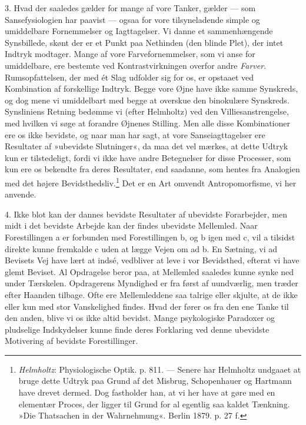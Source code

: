 \documentclass[12pt,a4paper,openany]{book}
\newcommand{\opage}[1]{\marginnote{\footnotesize\textit{[#1]}}}
\begin{document}
3. Hvad der saaledes gælder for mange af vore Tanker, gælder --- som
Sansefysiologien har paavist --- ogsaa for vore tilsyneladende simple og
umiddelbare Fornemmelser og Iagttagelser. Vi danne et sammenhængende
Synsbillede, skønt der er et Punkt paa Nethinden (den blinde Plet), der
intet Indtryk modtager. Mange af vore Farvefornemmelser, som vi anse for
umiddelbare, ere bestemte ved Kontrastvirkningen overfor andre
\emph{Farver}. Rumsopfattelsen, der med ét Slag udfolder sig for os, er
opstaaet ved Kombination af forskellige Indtryk. Begge vore Øjne have
ikke samme Synskreds, og dog mene vi umiddelbart med begge at overskue
den binokulære Synskreds. Synsliniens Retning bedømme vi (efter
Helmholtz) ved den Villiesanstrengelse, med hvilken vi søge at forandre
Øjnenes Stilling. Men alle disse Kombinationer ere os ikke bevidste, og
naar man har sagt, at vore Sanseiagttagelser ere Resultater af
»ubevidste Slutninger«, da maa det vel mærkes, at dette Udtryk kun er
tilstedeligt, fordi vi ikke have andre Betegnelser for disse Processer,
som kun ere os bekendte fra deres Resultater, end saadanne, som hentes
fra Analogien med
\opage{89}det højere Bevidsthedsliv.\footnote[1]{\emph{Helmholtz}:
Physiologische Optik. p. 811. --- Senere har Helmholtz undgaaet at bruge
dette Udtryk paa Grund af det Misbrug, Schopenhauer og Hartmann have
drevet dermed. Dog fastholder han, at vi her have at gøre med en
elementær Proces, der ligger til Grund for al egentlig saa kaldet
Tænkning. »Die Thatsachen in der Wahrnehmung«. Berlin 1879. p. 27 f.}
Det er en Art omvendt Antropomorfisme, vi her anvende.

4. Ikke blot kan der dannes bevidste Resultater af ubevidste
Forarbejder, men midt i det bevidste Arbejde kan der findes ubevidste
Mellemled. Naar Forestillingen a er forbunden med Forestillingen b, og b
igen med c, vil a tilsidst direkte kunne fremkalde c uden at lægge Vejen
om ad b. En Sætning, vi ad Bevisets Vej have lært at indsé, vedbliver at
leve i vor Bevidsthed, efterat vi have glemt Beviset. Al Opdragelse
beror paa, at Mellemled saaledes kunne synke ned under Tærskelen.
Opdragerens Myndighed er fra først af uundværlig, men træder efter
Haanden tilbage. Ofte ere Mellemleddene saa talrige eller skjulte, at de
ikke eller kun med stor Vanskelighed findes. Hvad der fører os fra den
ene Tanke til den anden, blive vi os ikke altid bevidst. Mange
psykologiske Paradoxer og pludselige Indskydelser kunne finde deres
Forklaring ved denne ubevidste Motivering af bevidste Forestillinger.
\end{document}
